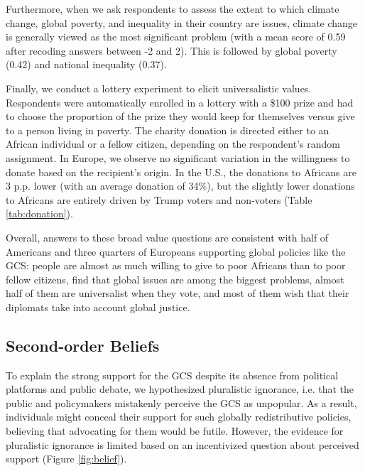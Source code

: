 Furthermore, when we ask respondents to assess the extent to which climate change, global poverty, and inequality in their country are issues, climate change is generally viewed as the most significant problem (with a mean score of 0.59 after recoding answers between -2 and 2). This is followed by global poverty (0.42) and national inequality (0.37). %

Finally, we conduct a lottery experiment to elicit universalistic values. Respondents were automatically enrolled in a lottery with a \$100 prize and had to choose the proportion of the prize they would keep for themselves versus give to a person living in poverty. The charity donation is directed either to an African individual or a fellow citizen, depending on the respondent's random assignment. In Europe, we observe no significant variation in the willingness to donate based on the recipient's origin. In the U.S., the donations to Africans are 3 p.p. lower (with an average donation of 34\%), but the slightly lower donations to Africans are entirely driven by Trump voters and non-voters (Table \ref{tab:donation}).

Overall, answers to these broad value questions are consistent with half of Americans and three quarters of Europeans supporting global policies like the GCS: people are almost as much willing to give to poor Africans than to poor fellow citizens, find that global issues are among the biggest problems, almost half of them are universalist when they vote, and most of them wish that their diplomats take into account global justice.

\subsection{Second-order Beliefs}\label{subsec:second_order_beliefs}
To explain the strong support for the GCS despite its absence from political platforms and public debate, we hypothesized pluralistic ignorance, i.e. that the public and policymakers mistakenly perceive the GCS as unpopular. As a result, individuals might conceal their support for such globally redistributive policies, believing that advocating for them would be futile. However, the evidence for pluralistic ignorance is limited based on an incentivized question about perceived support (Figure \ref{fig:belief}).

